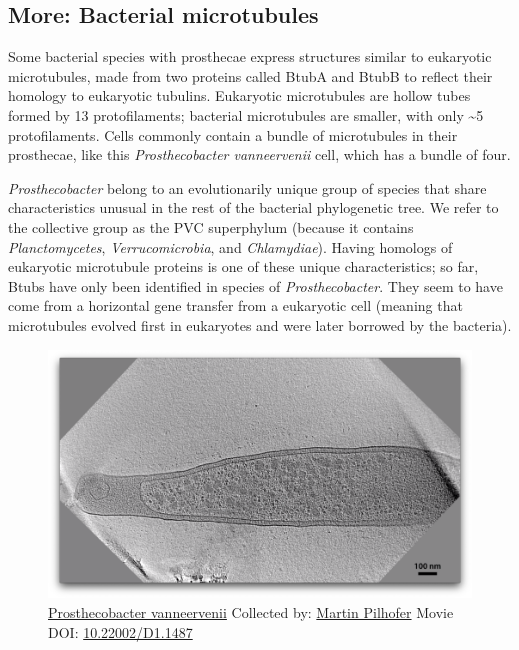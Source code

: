 \documentclass[]{tufte-book}
\begin{document}
\hypertarget{Bacterial_microtubules}{\subsection*{More: Bacterial
microtubules}\label{Bacterial_microtubules}}

Some bacterial species with prosthecae express structures similar to
eukaryotic microtubules, made from two proteins called BtubA and BtubB
to reflect their homology to eukaryotic tubulins. Eukaryotic
microtubules are hollow tubes formed by 13 protofilaments; bacterial
microtubules are smaller, with only \textasciitilde{}5 protofilaments.
Cells commonly contain a bundle of microtubules in their prosthecae,
like this \emph{Prosthecobacter vanneervenii} cell, which has a bundle
of four.

\emph{Prosthecobacter} belong to an evolutionarily unique group of
species that share characteristics unusual in the rest of the bacterial
phylogenetic tree. We refer to the collective group as the PVC
superphylum (because it contains \emph{Planctomycetes},
\emph{Verrucomicrobia}, and \emph{Chlamydiae}). Having homologs of
eukaryotic microtubule proteins is one of these unique characteristics;
so far, Btubs have only been identified in species of
\emph{Prosthecobacter}. They seem to have come from a horizontal gene
transfer from a eukaryotic cell (meaning that microtubules evolved first
in eukaryotes and were later borrowed by the bacteria).





\begin{figure}
\includegraphics{movie_stills/3_6a} \caption[\protect\hyperlink{tree}{Prosthecobacter vanneervenii}
Collected by: \protect\hyperlink{martin_pilhofer}{Martin Pilhofer} Movie
DOI: \href{https://doi.org/10.22002/D1.1487}{10.22002/D1.1487}]{\protect\hyperlink{tree}{Prosthecobacter vanneervenii}
Collected by: \protect\hyperlink{martin_pilhofer}{Martin Pilhofer} Movie
DOI: \href{https://doi.org/10.22002/D1.1487}{10.22002/D1.1487}}\label{fig:3-6a}
\end{figure}
\end{document}
